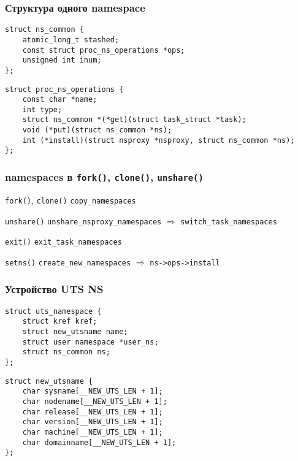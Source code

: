 \begin{frame}[fragile]
\frametitle{Структура одного namespace}
\begin{lstlisting}[title=\href{http://lxr.free-electrons.com/source/include/linux/ns_common.h\#L6}{ns\_common}]
struct ns_common {
    atomic_long_t stashed;
    const struct proc_ns_operations *ops;
    unsigned int inum;
};
\end{lstlisting}
\begin{lstlisting}[title=\href{http://lxr.free-electrons.com/source/include/linux/proc_ns.h\#L15}{proc\_ns\_operations}]
struct proc_ns_operations {
    const char *name;
    int type;
    struct ns_common *(*get)(struct task_struct *task);
    void (*put)(struct ns_common *ns);
    int (*install)(struct nsproxy *nsproxy, struct ns_common *ns);
};
\end{lstlisting}

\end{frame}

\begin{frame}[fragile]
\frametitle{namespaces в \texttt{fork()}, \texttt{clone()}, \texttt{unshare()}}

\begin{block}{\texttt{fork()}, \texttt{clone()}}
	\texttt{copy\_namespaces}
\end{block}

\begin{block}{\texttt{unshare()}}
	\texttt{unshare\_nsproxy\_namespaces} $\Rightarrow$ \texttt{switch\_task\_namespaces}
\end{block}

\begin{block}{\texttt{exit()}}
	\texttt{exit\_task\_namespaces}
\end{block}

\begin{block}{\texttt{setns()}}
	\texttt{create\_new\_namespaces} $\Rightarrow$ \texttt{ns->ops->install}
\end{block}

\end{frame}

\begin{frame}[fragile, label={uts_ns_inter}]
\frametitle{Устройство UTS NS}
\begin{lstlisting}[title=\href{http://lxr.free-electrons.com/source/include/linux/utsname.h\#L23}{uts\_namespace}]
struct uts_namespace {
    struct kref kref;
    struct new_utsname name;
    struct user_namespace *user_ns;
    struct ns_common ns;
};
\end{lstlisting}
\begin{lstlisting}[title=\href{http://lxr.free-electrons.com/source/include/uapi/linux/utsname.h\#L24}{utsname.h}]
struct new_utsname {
    char sysname[__NEW_UTS_LEN + 1];
    char nodename[__NEW_UTS_LEN + 1];
    char release[__NEW_UTS_LEN + 1];
    char version[__NEW_UTS_LEN + 1];
    char machine[__NEW_UTS_LEN + 1];
    char domainname[__NEW_UTS_LEN + 1];
};
\end{lstlisting}
\end{frame}

